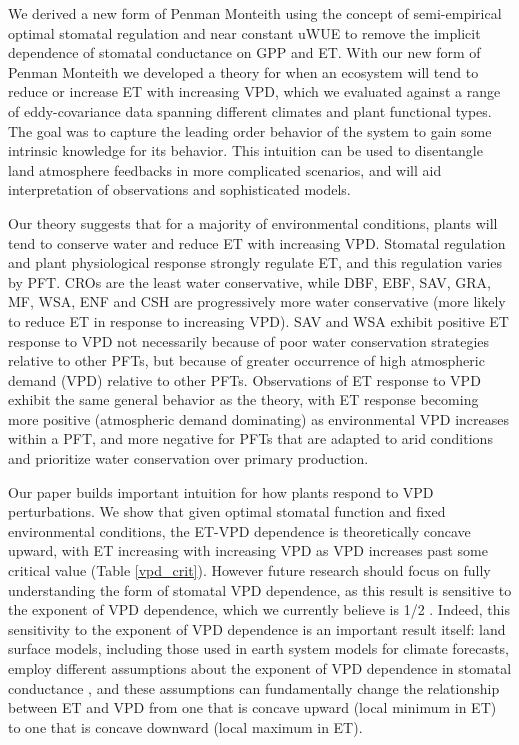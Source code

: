 We derived a new form of Penman Monteith using the concept of
semi-empirical optimal stomatal regulation \citep{Lin_2015,
  MEDLYN_2011} and near constant uWUE \citep{Zhou_2015} to remove the
implicit dependence of stomatal conductance on GPP and ET. With our
new form of Penman Monteith we developed a theory for when an
ecosystem will tend to reduce or increase ET with increasing VPD,
which we evaluated against a range of eddy-covariance data spanning
different climates and plant functional types. The goal was to capture
the leading order behavior of the system to gain some intrinsic
knowledge for its behavior. This intuition can be used to disentangle
land atmosphere feedbacks in more complicated scenarios, and will aid
interpretation of observations and sophisticated models.

Our theory suggests that for a majority of environmental conditions,
plants will tend to conserve water and reduce ET with increasing
VPD. Stomatal regulation and plant physiological response strongly
regulate ET, and this regulation varies by PFT. CROs are the least
water conservative, while DBF, EBF, SAV, GRA, MF, WSA, ENF and CSH are
progressively more water conservative (more likely to reduce ET in
response to increasing VPD). SAV and WSA exhibit positive ET response
to VPD not necessarily because of poor water conservation strategies
relative to other PFTs, but because of greater occurrence of high
atmospheric demand (VPD) relative to other PFTs. Observations of ET
response to VPD exhibit the same general behavior as the theory, with
ET response becoming more positive (atmospheric demand dominating) as
environmental VPD increases within a PFT, and more negative for PFTs
that are adapted to arid conditions and prioritize water conservation
over primary production.

Our paper builds important intuition for how plants respond to VPD
perturbations. We show that given optimal stomatal function and fixed
environmental conditions, the ET-VPD dependence is theoretically
concave upward, with ET increasing with increasing VPD as VPD
increases past some critical value (Table \ref{vpd_crit}). However
future research should focus on fully understanding the form of
stomatal VPD dependence, as this result is sensitive to the exponent
of VPD dependence, which we currently believe is 1/2
\citep{MEDLYN_2011, Zhou_2014}. Indeed, this sensitivity to the exponent of
VPD dependence is an important result itself: land surface models,
including those used in earth system models for climate forecasts,
employ different assumptions about the exponent of VPD dependence in
stomatal conductance \citep[e.g.,][]{Ball_1987, Leuning_1990,
MEDLYN_2011}, and these assumptions can fundamentally change the
relationship between ET and VPD from one that is concave upward (local
minimum in ET) to one that is concave downward (local maximum in ET).

